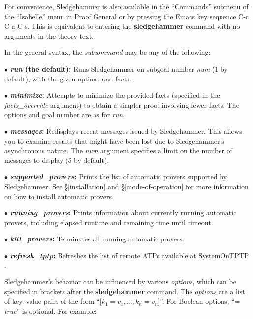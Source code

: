 \documentclass[a4paper,12pt]{article}
\begin{document}
For convenience, Sledgehammer is also available in the ``Commands'' submenu of
the ``Isabelle'' menu in Proof General or by pressing the Emacs key sequence C-c
C-a C-s. This is equivalent to entering the \textbf{sledgehammer} command with
no arguments in the theory text.

In the general syntax, the \textit{subcommand} may be any of the following:

\begin{enum}
\item[$\bullet$] \textbf{\textit{run} (the default):} Runs Sledgehammer on
subgoal number \textit{num} (1 by default), with the given options and facts.

\item[$\bullet$] \textbf{\textit{minimize}:} Attempts to minimize the provided facts
(specified in the \textit{facts\_override} argument) to obtain a simpler proof
involving fewer facts. The options and goal number are as for \textit{run}.

\item[$\bullet$] \textbf{\textit{messages}:} Redisplays recent messages issued
by Sledgehammer. This allows you to examine results that might have been lost
due to Sledgehammer's asynchronous nature. The \textit{num} argument specifies a
limit on the number of messages to display (5 by default).

\item[$\bullet$] \textbf{\textit{supported\_provers}:} Prints the list of
automatic provers supported by Sledgehammer. See \S\ref{installation} and
\S\ref{mode-of-operation} for more information on how to install automatic
provers.

\item[$\bullet$] \textbf{\textit{running\_provers}:} Prints information about
currently running automatic provers, including elapsed runtime and remaining
time until timeout.

\item[$\bullet$] \textbf{\textit{kill\_provers}:} Terminates all running
automatic provers.

\item[$\bullet$] \textbf{\textit{refresh\_tptp}:} Refreshes the list of remote
ATPs available at System\-On\-TPTP \cite{sutcliffe-2000}.
\end{enum}

Sledgehammer's behavior can be influenced by various \textit{options}, which can
be specified in brackets after the \textbf{sledgehammer} command. The
\textit{options} are a list of key--value pairs of the form ``[$k_1 = v_1,
\ldots, k_n = v_n$]''. For Boolean options, ``= \textit{true}'' is optional. For
example:
\end{document}
